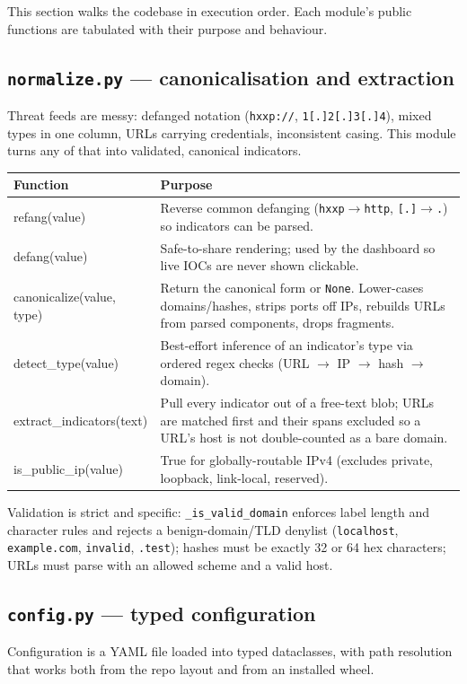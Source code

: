 \documentclass[11pt,a4paper]{article}
\newcommand{\code}[1]{\texttt{\small #1}}
\begin{document}
This section walks the codebase in execution order. Each module's public
functions are tabulated with their purpose and behaviour.

\subsection{\code{normalize.py} --- canonicalisation and extraction}
Threat feeds are messy: defanged notation (\code{hxxp://}, \code{1[.]2[.]3[.]4}),
mixed types in one column, URLs carrying credentials, inconsistent casing. This
module turns any of that into validated, canonical indicators.

\begin{center}
\begin{tabularx}{\linewidth}{@{}>{\ttfamily\small}p{4.4cm}X@{}}
\toprule
\rowcolor{paper}\textbf{Function} & \textbf{Purpose} \\
\midrule
refang(value) & Reverse common defanging (\code{hxxp}$\rightarrow$\code{http}, \code{[.]}$\rightarrow$\code{.}) so indicators can be parsed. \\
defang(value) & Safe-to-share rendering; used by the dashboard so live IOCs are never shown clickable. \\
canonicalize(value, type) & Return the canonical form or \code{None}. Lower-cases domains/hashes, strips ports off IPs, rebuilds URLs from parsed components, drops fragments. \\
detect\_type(value) & Best-effort inference of an indicator's type via ordered regex checks (URL $\rightarrow$ IP $\rightarrow$ hash $\rightarrow$ domain). \\
extract\_indicators(text) & Pull every indicator out of a free-text blob; URLs are matched first and their spans excluded so a URL's host is not double-counted as a bare domain. \\
is\_public\_ip(value) & True for globally-routable IPv4 (excludes private, loopback, link-local, reserved). \\
\bottomrule
\end{tabularx}
\end{center}

Validation is strict and specific: \code{\_is\_valid\_domain} enforces label
length and character rules and rejects a benign-domain/TLD denylist
(\code{localhost}, \code{example.com}, \code{invalid}, \code{.test}); hashes must
be exactly 32 or 64 hex characters; URLs must parse with an allowed scheme and a
valid host.

\subsection{\code{config.py} --- typed configuration}
Configuration is a YAML file loaded into typed dataclasses, with path
resolution that works both from the repo layout and from an installed wheel.
\end{document}
